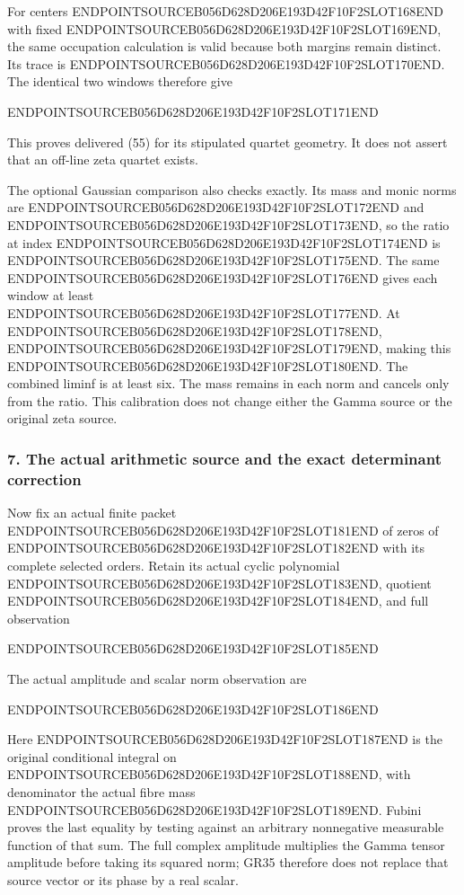 For centers ENDPOINTSOURCEB056D628D206E193D42F10F2SLOT168END with fixed ENDPOINTSOURCEB056D628D206E193D42F10F2SLOT169END, the same occupation calculation is valid because both margins remain distinct. Its trace is ENDPOINTSOURCEB056D628D206E193D42F10F2SLOT170END. The identical two windows therefore give

ENDPOINTSOURCEB056D628D206E193D42F10F2SLOT171END

This proves delivered (55) for its stipulated quartet geometry. It does not assert that an off-line zeta quartet exists.

The optional Gaussian comparison also checks exactly. Its mass and monic norms are ENDPOINTSOURCEB056D628D206E193D42F10F2SLOT172END and ENDPOINTSOURCEB056D628D206E193D42F10F2SLOT173END, so the ratio at index ENDPOINTSOURCEB056D628D206E193D42F10F2SLOT174END is ENDPOINTSOURCEB056D628D206E193D42F10F2SLOT175END. The same ENDPOINTSOURCEB056D628D206E193D42F10F2SLOT176END gives each window at least ENDPOINTSOURCEB056D628D206E193D42F10F2SLOT177END. At ENDPOINTSOURCEB056D628D206E193D42F10F2SLOT178END, ENDPOINTSOURCEB056D628D206E193D42F10F2SLOT179END, making this ENDPOINTSOURCEB056D628D206E193D42F10F2SLOT180END. The combined liminf is at least six. The mass remains in each norm and cancels only from the ratio. This calibration does not change either the Gamma source or the original zeta source.

\subsubsection{7. The actual arithmetic source and the exact determinant correction}\label{endpoint-gamma_review--the-actual-arithmetic-source-and-the-exact-determinant-correction}

Now fix an actual finite packet ENDPOINTSOURCEB056D628D206E193D42F10F2SLOT181END of zeros of ENDPOINTSOURCEB056D628D206E193D42F10F2SLOT182END with its complete selected orders. Retain its actual cyclic polynomial ENDPOINTSOURCEB056D628D206E193D42F10F2SLOT183END, quotient ENDPOINTSOURCEB056D628D206E193D42F10F2SLOT184END, and full observation

ENDPOINTSOURCEB056D628D206E193D42F10F2SLOT185END

The actual amplitude and scalar norm observation are

ENDPOINTSOURCEB056D628D206E193D42F10F2SLOT186END

Here ENDPOINTSOURCEB056D628D206E193D42F10F2SLOT187END is the original conditional integral on ENDPOINTSOURCEB056D628D206E193D42F10F2SLOT188END, with denominator the actual fibre mass ENDPOINTSOURCEB056D628D206E193D42F10F2SLOT189END. Fubini proves the last equality by testing against an arbitrary nonnegative measurable function of that sum. The full complex amplitude multiplies the Gamma tensor amplitude before taking its squared norm; GR35 therefore does not replace that source vector or its phase by a real scalar.


